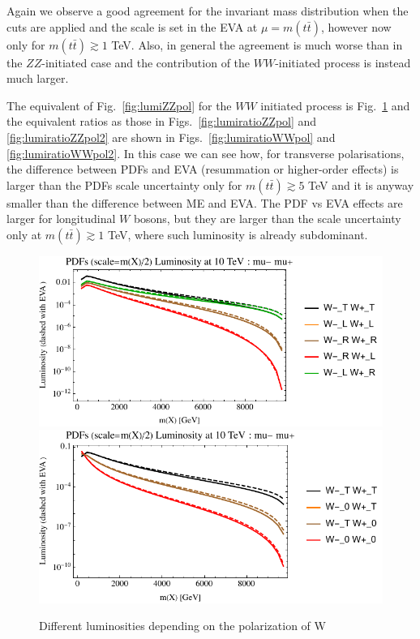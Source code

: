 \documentclass[a4paper,11pt]{article}
\begin{document}
Again we observe a good agreement for the invariant mass distribution when the cuts are applied and the scale is set in the EVA at $\mu=m(t \bar t)$, however now only for $m(t \bar t) \gtrsim 1 $ TeV. Also, in general the agreement is much worse than in the $ZZ$-initiated case and the contribution of the $WW$-initiated process is instead much larger. 

The equivalent of Fig.~\ref{fig:lumiZZpol} for the $WW$ initiated process is Fig.~\ref{fig:lumiWWpol} and the equivalent ratios as those in Figs.~\ref{fig:lumiratioZZpol} and \ref{fig:lumiratioZZpol2} are shown in Figs.~\ref{fig:lumiratioWWpol} and \ref{fig:lumiratioWWpol2}. In this case we can see how, for transverse polarisations, the difference between PDFs and EVA (resummation or higher-order effects) is larger than the PDFs scale uncertainty only for  $m(t \bar t) \gtrsim 5 $ TeV and it is anyway smaller than the difference between ME and EVA. The PDF vs EVA effects are larger for longitudinal $W$ bosons, but they are larger than the scale uncertainty only at  $m(t \bar t) \gtrsim 1 $ TeV, where such luminosity is already subdominant.  


\begin{figure}[!t]
\includegraphics[width=0.46\linewidth]{Notebooks/PlotLumi/10TeV/lumis/plotWWpolRandL.pdf}
\includegraphics[width=0.46\linewidth]{Notebooks/PlotLumi/10TeV/lumis/plotWWpolTand0.pdf}
\caption{Different luminosities depending on the polarization of W \label{fig:lumiWWpol}}
\end{figure}
 
\end{document}
